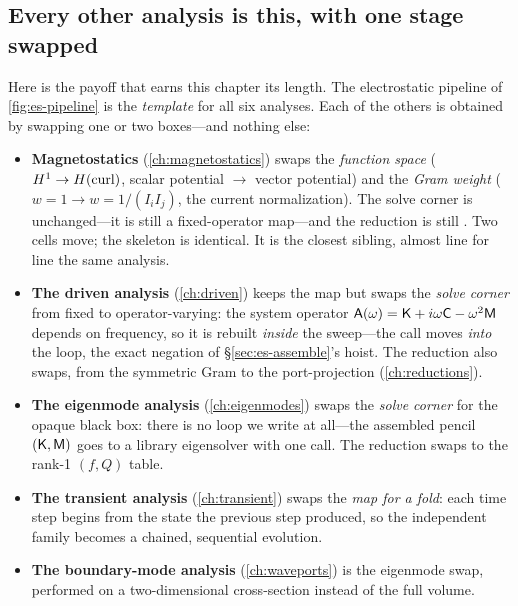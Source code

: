 \subsection{Every other analysis is this, with one stage swapped}

Here is the payoff that earns this chapter its length. The electrostatic pipeline
of \cref{fig:es-pipeline} is the \emph{template} for all six analyses. Each of the
others is obtained by swapping one or two boxes---and nothing else:

\begin{itemize}
  \item \textbf{Magnetostatics} (\cref{ch:magnetostatics}) swaps the
  \emph{function space} ($H^1\to H(\mathrm{curl})$, scalar potential $\to$ vector potential)
  and the \emph{Gram weight} ($w=1\to w=1/(I_iI_j)$, the current normalization). The
  solve corner is unchanged---it is still a fixed-operator map---and the reduction
  is still . Two cells move; the skeleton is identical. It is the
  closest sibling, almost line for line the same analysis.
  \item \textbf{The driven analysis} (\cref{ch:driven}) keeps the map but swaps the
  \emph{solve corner} from fixed to operator-varying: the system operator
  $\mathsf{A}(\omega)=\mathsf{K}+i\omega\mathsf{C}-\omega^2\mathsf{M}$ depends on frequency, so it is
  rebuilt \emph{inside} the sweep---the  call moves \emph{into}
  the loop, the exact negation of \S\ref{sec:es-assemble}'s hoist. The reduction
  also swaps, from the symmetric Gram to the port-projection
  (\cref{ch:reductions}).
  \item \textbf{The eigenmode analysis} (\cref{ch:eigenmodes}) swaps the
  \emph{solve corner} for the opaque black box: there is no loop we write at all---the
  assembled pencil $(\mathsf{K},\mathsf{M})$ goes to a library eigensolver with one call. The
  reduction swaps to the rank-1 $(f,Q)$ table.
  \item \textbf{The transient analysis} (\cref{ch:transient}) swaps the
  \emph{map for a fold}: each time step begins from the state the previous step
  produced, so the independent family becomes a chained, sequential evolution.
  \item \textbf{The boundary-mode analysis} (\cref{ch:waveports}) is the eigenmode
  swap, performed on a two-dimensional cross-section instead of the full volume.
\end{itemize}

